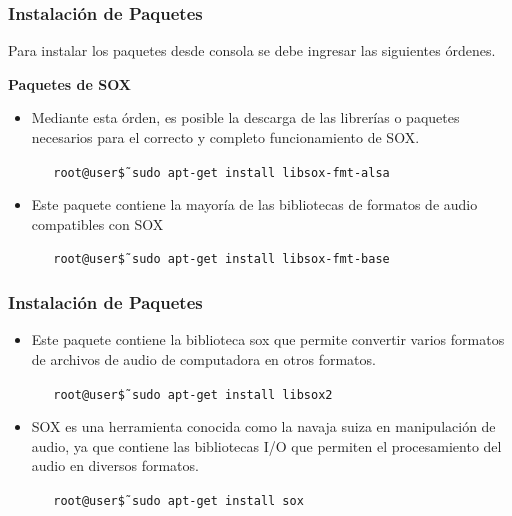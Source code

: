 \begin{frame}
\frametitle{Instalación de Paquetes}

Para instalar los paquetes desde consola se debe ingresar las siguientes órdenes.

\textbf{Paquetes de SOX}
\begin{itemize}
 
    \item { Mediante esta órden, es posible la descarga de las librerías o paquetes necesarios para el correcto y completo funcionamiento de SOX.
    \begin{block}{}
    \texttt
    {\ \ \ root@user\~\$ sudo apt-get install libsox-fmt-alsa}
    \end{block}}
    
    \item{Este paquete contiene la mayoría de las bibliotecas de formatos de audio compatibles con SOX
    \begin{block}{}
    \texttt
    {\ \ \ root@user\~\$ sudo apt-get install libsox-fmt-base}
    \end{block}}
\end{itemize}

\end{frame}

\begin{frame}
\frametitle{Instalación de Paquetes}

\begin{itemize}
    \item {Este paquete contiene la biblioteca sox que permite convertir varios formatos de archivos de audio de computadora en otros formatos.
    \begin{block}{}
    \texttt
    {\ \ \ root@user\~\$ sudo apt-get install libsox2}
    \end{block}}
    
    \item{SOX es una herramienta conocida como la navaja suiza en manipulación de audio, ya que contiene las bibliotecas I/O que permiten el procesamiento del audio en diversos formatos.
    \begin{block}{}
    \texttt
    {\ \ \ root@user\~\$ sudo apt-get install sox}
    \end{block}}
\end{itemize}

\end{frame}

